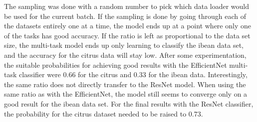 The sampling was done with a random number to pick which data loader would be used for the current batch.
If the sampling is done by going through each of the datasets entirely one at a time, the model ends up at a point where only one of the tasks has good accuracy.
If the ratio is left as proportional to the data set size, the multi-task model ends up only learning to classify the ibean data set, and the accuracy for the citrus data will stay low.
After some experimentation, the suitable probabilities for achieving good results with the EfficientNet multi-task classifier were 0.66 for the citrus and 0.33 for the ibean data.
Interestingly, the same ratio does not directly transfer to the ResNet model.
When using the same ratio as with the EfficientNet, the model still seems to converge only on a good result for the ibean data set.
For the final results with the ResNet classifier, the probability for the citrus dataset needed to be raised to 0.73.

